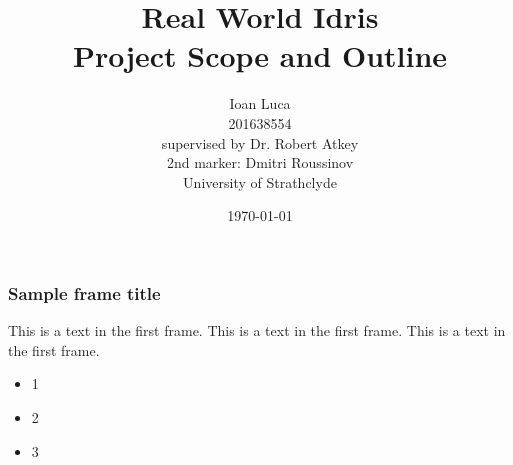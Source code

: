\documentclass{beamer}
\title{Real World Idris \\ Project Scope and Outline}
\author{Ioan Luca \\ 201638554 \\ \small supervised by Dr. Robert Atkey \\
	\small 2nd marker: Dmitri Roussinov \\
	\small University of Strathclyde} %
\date{\today}
\begin{document}
 
\frame{\titlepage}

 
\begin{frame}
\frametitle{Sample frame title}
This is a text in the first frame. This is a text in the first frame. This is a text in the first frame.
\begin{itemize}
	\item 1 \pause
	\item 2
	\item 3
\end{itemize}
\end{frame}


\begin{frame}
	
\end{frame}


 
\end{document}
